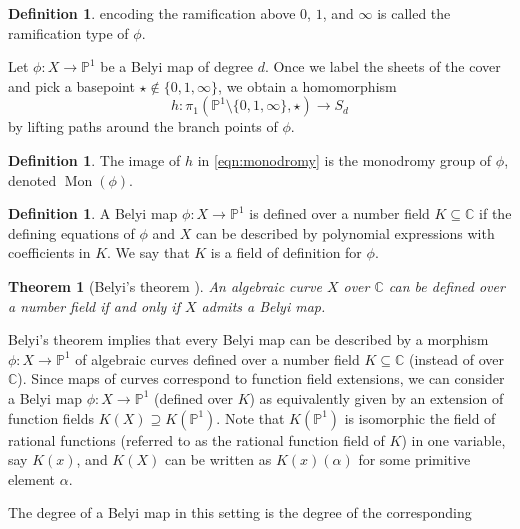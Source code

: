 \documentclass{dcthesis}
\newcommand{\PP}{\mathbb P}
\newcommand{\CC}{\mathbb C}
\newcommand{\defi}[1]{\textsf{#1}}
\DeclareMathOperator{\Mon}{Mon}
\numberwithin{equation}{section}
\newtheorem{theorem}[equation]{Theorem}
\theoremstyle{definition}
\newtheorem{definition}[equation]{Definition}
\theoremstyle{remark}
\begin{document}
{{{\begin{definition}
      encoding the ramification
      above
      $0$, $1$, and $\infty$
      is called
      the \defi{ramification type} of $\phi$.
    \end{definition}
    Let $\phi\colon X\to\PP^1$ be a
    Belyi map of degree $d$.
    Once we label the sheets of the cover
    and pick a basepoint
    $\star\not\in\{0,1,\infty\}$,
    we obtain a homomorphism
    \begin{equation}\label{eqn:monodromy}
      h\colon\pi_1(\PP^1\setminus\{0,1,\infty\},
      \star)\to S_d
    \end{equation}
    by lifting paths around the
    branch points of $\phi$.
    \begin{definition}\label{def:monodromy}
      The image of $h$ in \eqref{eqn:monodromy}
      is the \defi{monodromy group} of $\phi$,
      denoted $\Mon(\phi)$.
    \end{definition}
    \begin{definition}
      \label{def:definedover}
      A Belyi map
      $\phi\colon X\to\PP^1$
      is \defi{defined over}
      a number field $K\subseteq\CC$
      if the defining equations
      of $\phi$ and $X$
      can be described by
      polynomial expressions
      with coefficients in $K$.
      We say that $K$ is a
      \defi{field of definition}
      for $\phi$.
    \end{definition}
    \begin{theorem}
      [Belyi's theorem \cite{belyi}]
      \label{thm:belyistheorem}
      An algebraic curve $X$ over $\CC$
      can be defined over a number field
      if and only if $X$
      admits a Belyi map.
    \end{theorem}
    Belyi's theorem implies that
    every Belyi map can be described by
    a morphism $\phi\colon X\to\PP^1$
    of algebraic curves
    defined over a number field $K\subseteq\CC$
    (instead of over $\CC$).
    Since maps of curves
    correspond to function field
    extensions,
    we can consider a Belyi map
    $\phi\colon X\to\PP^1$
    (defined over $K$)
    as equivalently given by
    an extension of function fields
    $K(X)\supseteq K(\PP^1)$.
    Note that
    $K(\PP^1)$ is isomorphic the field of
    rational functions
    (referred to as the
    \defi{rational function field} of $K$)
    in one variable,
    say $K(x)$,
    and $K(X)$
    can be written as $K(x)(\alpha)$
    for some primitive element $\alpha$.
    \par
    The degree of a Belyi map
    in this setting
    is the degree of the corresponding
}}}
\end{document}
